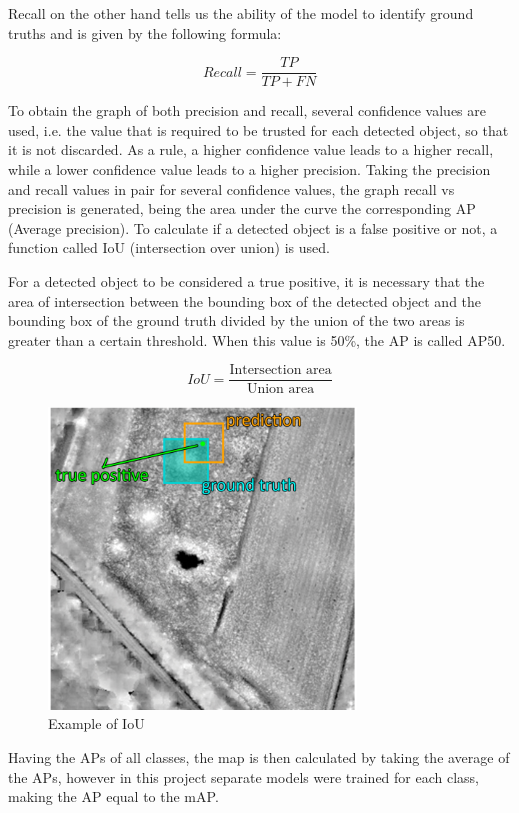 Recall on the other hand tells us the ability of the model to identify ground truths and is given by the following formula:

\begin{equation}
     Recall = \frac{TP }{TP + FN}
\end{equation}

To obtain the graph of both precision and recall, several confidence values are used, i.e. the value that is required to be trusted for each detected object, so that it is not discarded. As a rule, a higher confidence value leads to a higher recall, while a lower confidence value leads to a higher precision. Taking the precision and recall values in pair for several confidence values, the graph recall vs precision is generated, being the area under the curve the corresponding AP (Average precision). To calculate if a detected object is a false positive or not, a function called IoU (intersection over union) is used.

For a detected object to be considered a true positive, it is necessary that the area of intersection between the bounding box of the detected object and the bounding box of the ground truth divided by the union of the two areas is greater than a certain threshold. When this value is 50\%, the AP is called AP50.

\begin{equation}
     IoU = \frac{\text{Intersection area}}{\text{Union area}}
\end{equation}

\begin{figure}[H]
\centering
\includegraphics[height=8cm]{images/IOU.png}
\caption{Example of IoU \cite{IOUpaper}}
\end{figure}

Having the APs of all classes, the \ac{map} is then calculated by taking the average of the APs, however in this project separate models were trained for each class, making the AP equal to the mAP.

